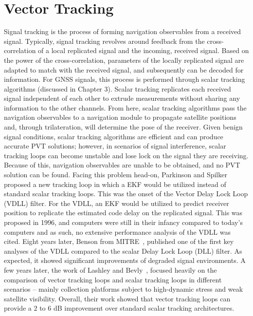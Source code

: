 \section{\textbf{Vector Tracking}}
Signal tracking is the process of forming navigation observables from a received signal. Typically, signal tracking revolves around feedback from the cross-correlation of a local replicated signal and the incoming, received signal. Based on the power of the cross-correlation, parameters of the locally replicated signal are adapted to match with the received signal, and subsequently can be decoded for information. For GNSS signals, this process is performed through scalar tracking algorithms (discussed in Chapter 3). Scalar tracking replicates each received signal independent of each other to extrude measurements without sharing any information to the other channels. From here, scalar tracking algorithms pass the navigation observables to a navigation module to propagate satellite positions and, through trilateration, will determine the pose of the receiver. Given benign signal conditions, scalar tracking algorithms are efficient and can produce accurate PVT solutions; however, in scenarios of signal interference, scalar tracking loops can become unstable and lose lock on the signal they are receiving. Because of this, navigation observables are unable to be obtained, and no PVT solution can be found.
Facing this problem head-on, Parkinson and Spilker~\cite{bradfordparkinsonGlobalPositioningSystem1996} proposed a new tracking loop in which a EKF would be utilized instead of standard scalar tracking loops. This was the onset of the Vector Delay Lock Loop (VDLL) filter. For the VDLL, an EKF would be utilized to predict receiver position to replicate the estimated code delay on the replicated signal. This was proposed in 1996, and computers were still in their infancy compared to today's computers and as such, no extensive performance analysis of the VDLL was cited.
Eight years later, Benson from MITRE~\cite{bensonInterferenceBenefitsVector}, published one of the first key analyses of the VDLL compared to the scalar Delay Lock Loop (DLL) filter. As expected, it showed significant improvements of degraded signal environments. A few years later, the work of Lashley and Bevly~\cite{lashleyPerformanceAnalysisVector2009,edwardsImplementationDetailsDeeply2010,matthewlashelyModelingPerformanceAnalysis2009}, focused heavily on the comparison of vector tracking loops and scalar tracking loops in different scenarios {--} mainly collection platforms subject to high-dynamic stress and weak satellite visibility. Overall, their work showed that vector tracking loops can provide a \(2\) to \(6\) dB improvement over standard scalar tracking architectures.

